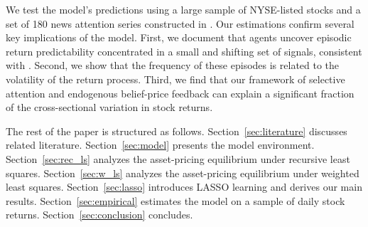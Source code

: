 We test the model's predictions using a large sample of NYSE-listed stocks and a set of 180 news attention series constructed in \citet{Bybee2021}.
Our estimations confirm several key implications of the model.
First, we document that agents uncover episodic return predictability concentrated in a small and shifting set of signals, consistent with \citet{Chinco2019}.
Second, we show that the frequency of these episodes is related to the volatility of the return process.
Third, we find that our framework of selective attention and endogenous belief-price feedback can explain a significant fraction of the cross-sectional variation in stock returns.

The rest of the paper is structured as follows.
Section~\ref{sec:literature} discusses related literature.
Section~\ref{sec:model} presents the model environment.
Section~\ref{sec:rec_ls} analyzes the asset-pricing equilibrium under recursive least squares.
Section~\ref{sec:w_ls} analyzes the asset-pricing equilibrium under weighted least squares.
Section~\ref{sec:lasso} introduces LASSO learning and derives our main results.
Section~\ref{sec:empirical} estimates the model on a sample of daily stock returns.
Section~\ref{sec:conclusion} concludes.

